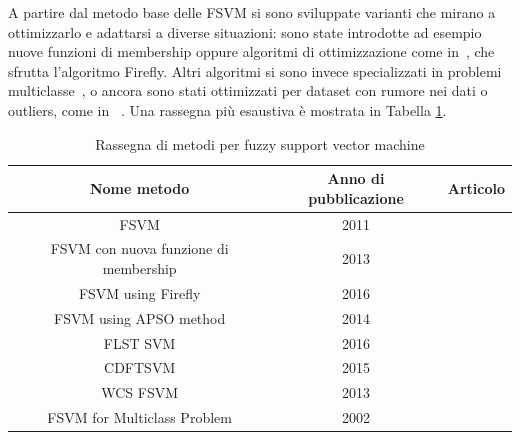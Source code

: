 \documentclass[oneside, openany]{book}
\begin{document}
	A partire dal metodo base delle FSVM si sono sviluppate varianti che mirano a ottimizzarlo e adattarsi a diverse situazioni: sono state introdotte ad esempio nuove funzioni di membership oppure algoritmi di ottimizzazione come in~\cite{bib:firefly}, che sfrutta l'algoritmo Firefly. Altri algoritmi si sono invece specializzati in problemi multiclasse~\cite{bib:multi}, o ancora sono stati ottimizzati per dataset con rumore nei dati o outliers, come in ~\cite{bib:apso,bib:wcs}. Una rassegna più esaustiva è mostrata in Tabella \ref{tab:svm}.
	\begin{table}[h]
		\caption{Rassegna di metodi per fuzzy support vector machine}
		\begin{center}\begin{tabular}{ |c|c|c| } 
				\hline
				Nome metodo & Anno di pubblicazione & Articolo\\
				\hline
				FSVM & 2011 & \cite{bib:fsvm}\\
				\hline
				FSVM con nuova funzione di membership & 2013 & \cite{bib:fsvm2}\\ 
				\hline
				FSVM using Firefly & 2016 & \cite{bib:firefly}\\
				\hline
				FSVM using APSO method & 2014 & \cite{bib:apso} \\
				\hline
				FLST SVM & 2016 & \cite{bib:flst} \\
				\hline
				CDFTSVM & 2015 & \cite{bib:cdt}\\
				\hline	
				WCS FSVM & 2013 & \cite{bib:wcs}\\
				\hline	
				FSVM for Multiclass Problem & 2002 & \cite{bib:multi} \\
				\hline										
			\end{tabular}
		\end{center}
		\label{tab:svm}	
	\end{table}
\end{document}
